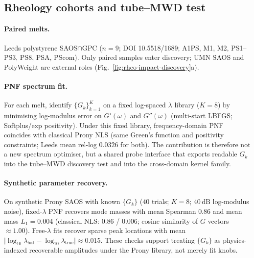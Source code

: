 \documentclass[twocolumn, 10pt]{article}
\begin{document}
\subsection*{Rheology cohorts and tube--MWD test}

\paragraph{Paired melts.}
Leeds polystyrene SAOS\(\cap\)GPC (\(n=9\); DOI 10.5518/1689; A1PS, M1, M2, PS1--PS3, PS8, PSA, PScom)\cite{elliott2025}. Only paired samples enter discovery; UMN SAOS and PolyWeight are external roles (Fig.~\ref{fig:rheo-impact-discovery}a).

\paragraph{PNF spectrum fit.}
For each melt, identify \(\{G_k\}_{k=1}^{K}\) on a fixed log-spaced \(\lambda\) library (\(K=8\)) by minimising log-modulus error on \(G'(\omega)\) and \(G''(\omega)\) (multi-start LBFGS; Softplus/exp positivity). Under this fixed library, frequency-domain PNF coincides with classical Prony NLS (same Green's function and positivity constraints; Leeds mean rel-log \(0.0326\) for both). The contribution is therefore not a new spectrum optimiser, but a shared probe interface that exports readable \(G_k\) into the tube--MWD discovery test and into the cross-domain kernel family.

\paragraph{Synthetic parameter recovery.}
On synthetic Prony SAOS with known \(\{G_k\}\) (\(40\) trials; \(K=8\); \(40\,\mathrm{dB}\) log-modulus noise), fixed-\(\lambda\) PNF recovers mode masses with mean Spearman \(0.86\) and mean mass \(L_1=0.004\) (classical NLS: \(0.86\) / \(0.006\); cosine similarity of \(G\) vectors \(\approx1.00\)). Free-\(\lambda\) fits recover sparse peak locations with mean \(\lvert\log_{10}\lambda_{\mathrm{hat}}-\log_{10}\lambda_{\mathrm{true}}\rvert\approx0.015\). These checks support treating \(\{G_k\}\) as physics-indexed recoverable amplitudes under the Prony library, not merely fit knobs.
\end{document}
